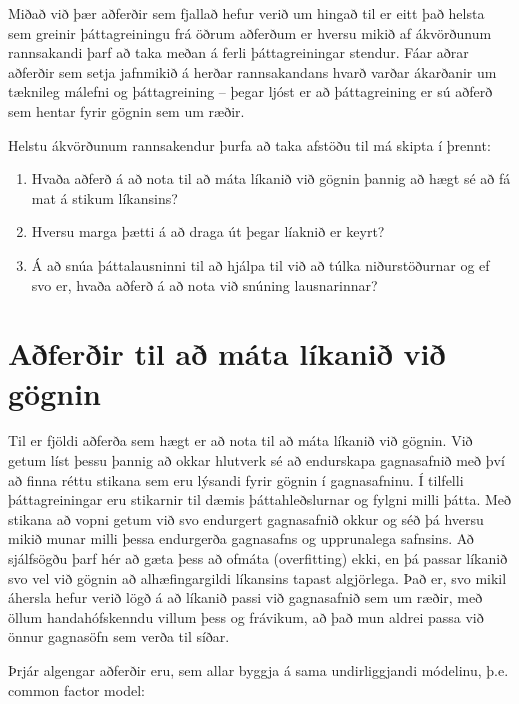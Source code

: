 \documentclass[]{book}
\providecommand{\tightlist}{%
  \setlength{\itemsep}{0pt}\setlength{\parskip}{0pt}}
\begin{document}
Miðað við þær aðferðir sem fjallað hefur verið um hingað til er eitt það helsta sem greinir þáttagreiningu frá öðrum aðferðum er hversu mikið af ákvörðunum rannsakandi þarf að taka meðan á ferli þáttagreiningar stendur. Fáar aðrar aðferðir sem setja jafnmikið á herðar rannsakandans hvarð varðar ákarðanir um tæknileg málefni og þáttagreining -- þegar ljóst er að þáttagreining er sú aðferð sem hentar fyrir gögnin sem um ræðir.

Helstu ákvörðunum rannsakendur þurfa að taka afstöðu til má skipta í þrennt:

\begin{enumerate}
\def\labelenumi{\arabic{enumi})}
\tightlist
\item
  Hvaða aðferð á að nota til að máta líkanið við gögnin þannig að hægt sé að fá mat á stikum líkansins?
\item
  Hversu marga þætti á að draga út þegar líaknið er keyrt?
\item
  Á að snúa þáttalausninni til að hjálpa til við að túlka niðurstöðurnar og ef svo er, hvaða aðferð á að nota við snúning lausnarinnar?
\end{enumerate}

\hypertarget{auxf0feruxf0ir-til-auxf0-muxe1ta-luxedkaniuxf0-viuxf0-guxf6gnin}{%
\section{Aðferðir til að máta líkanið við gögnin}\label{auxf0feruxf0ir-til-auxf0-muxe1ta-luxedkaniuxf0-viuxf0-guxf6gnin}}

Til er fjöldi aðferða sem hægt er að nota til að máta líkanið við gögnin. Við getum líst þessu þannig að okkar hlutverk sé að endurskapa gagnasafnið með því að finna réttu stikana sem eru lýsandi fyrir gögnin í gagnasafninu. Í tilfelli þáttagreiningar eru stikarnir til dæmis þáttahleðslurnar og fylgni milli þátta. Með stikana að vopni getum við svo endurgert gagnasafnið okkur og séð þá hversu mikið munar milli þessa endurgerða gagnasafns og upprunalega safnsins. Að sjálfsögðu þarf hér að gæta þess að ofmáta (overfitting) ekki, en þá passar líkanið svo vel við gögnin að alhæfingargildi líkansins tapast algjörlega. Það er, svo mikil áhersla hefur verið lögð á að líkanið passi við gagnasafnið sem um ræðir, með öllum handahófskenndu villum þess og frávikum, að það mun aldrei passa við önnur gagnasöfn sem verða til síðar.

Þrjár algengar aðferðir eru, sem allar byggja á sama undirliggjandi módelinu, þ.e. common factor model:
\end{document}
